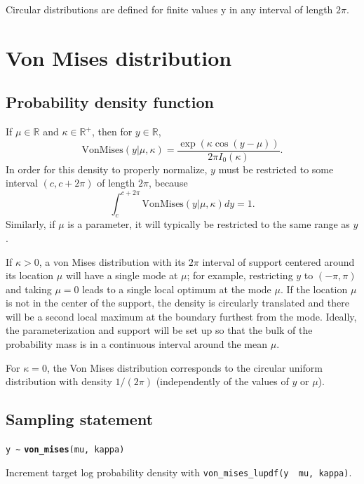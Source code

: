 \documentclass[
  10pt,
]{book}
\begin{document}
Circular distributions are defined for finite values y in any interval
of length \(2\pi\).

\hypertarget{von-mises-distribution}{%
\section{Von Mises distribution}\label{von-mises-distribution}}

\hypertarget{probability-density-function-23}{%
\subsection{Probability density function}\label{probability-density-function-23}}

If \(\mu \in \mathbb{R}\) and \(\kappa \in \mathbb{R}^+\), then for \(y \in \mathbb{R}\), \[ \text{VonMises}(y|\mu,\kappa) =
\frac{\exp(\kappa\cos(y-\mu))}{2\pi I_0(\kappa)} \!. \] In order for
this density to properly normalize, \(y\) must be restricted to some
interval \((c, c + 2\pi)\) of length \(2 \pi\), because \[ \int_{c}^{c +
2\pi} \text{VonMises}(y|\mu,\kappa) dy = 1. \] Similarly, if \(\mu\) is
a parameter, it will typically be restricted to the same range as \(y\).

If \(\kappa > 0\), a von Mises distribution with its \(2 \pi\) interval of
support centered around its location \(\mu\) will have a single mode at \(\mu\);
for example, restricting \(y\) to \((-\pi,\pi)\) and taking \(\mu = 0\) leads to
a single local optimum at the mode \(\mu\). If the location \(\mu\) is
not in the center of the support, the density is circularly translated
and there will be a second local maximum at the boundary furthest from
the mode. Ideally, the parameterization and support will be set up so
that the bulk of the probability mass is in a continuous interval
around the mean \(\mu\).

For \(\kappa = 0\), the Von Mises distribution corresponds to the
circular uniform distribution with density \(1 / (2 \pi)\) (independently
of the values of \(y\) or \(\mu\)).

\hypertarget{sampling-statement-47}{%
\subsection{Sampling statement}\label{sampling-statement-47}}

\texttt{y\ \textasciitilde{}} \textbf{\texttt{von\_mises}}\texttt{(mu,\ kappa)}

Increment target log probability density with \texttt{von\_mises\_lupdf(y\ \textbar{}\ mu,\ kappa)}.
\end{document}
